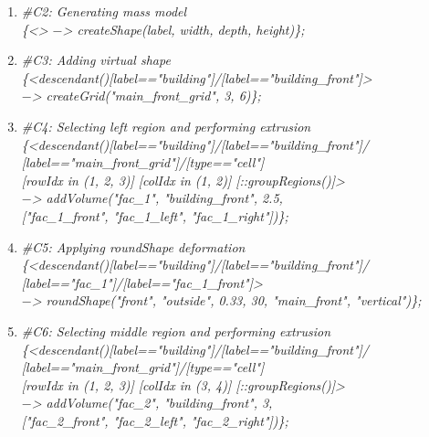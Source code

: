 \begin{enumerate}[label=(\alph*)]
    \item \textit{\#C2: Generating mass model} \\
            \textit{\{<> $-$> createShape(label, width, depth, height)\};}
            
    \item \textit{\#C3: Adding virtual shape} \\
            \qquad \textit{\{<descendant()[label=="building"]/[label=="building\_front"]>} \\
            \qquad \textit{$-$> createGrid("main\_front\_grid", 3, 6)\};}
    
    \item \textit{\#C4: Selecting left region and performing extrusion} \\
            \qquad \textit{\{<descendant()[label=="building"]/[label=="building\_front"]/} \\
            \qquad \textit{[label=="main\_front\_grid"]/[type=="cell"]} \\
            \qquad \textit{[rowIdx in (1, 2, 3)] [colIdx in (1, 2)] [::groupRegions()]>} \\
            \qquad \textit{$-$> addVolume("fac\_1", "building\_front", 2.5,} \\
            \qquad \textit{["fac\_1\_front", "fac\_1\_left", "fac\_1\_right"])\};}
            
    \item \textit{\#C5: Applying roundShape deformation} \\
            \qquad \textit{\{<descendant()[label=="building"]/[label=="building\_front"]/} \\
            \qquad \textit{[label=="fac\_1"]/[label=="fac\_1\_front"]>} \\
            \qquad \textit{$-$> roundShape("front", "outside", 0.33, 30, "main\_front", "vertical")\};}
            
    \item \textit{\#C6: Selecting middle region and performing extrusion} \\
            \qquad \textit{\{<descendant()[label=="building"]/[label=="building\_front"]/} \\
            \qquad \textit{[label=="main\_front\_grid"]/[type=="cell"]} \\
            \qquad \textit{[rowIdx in (1, 2, 3)] [colIdx in (3, 4)] [::groupRegions()]>} \\
            \qquad \textit{$-$> addVolume("fac\_2", "building\_front", 3,} \\
            \qquad \textit{["fac\_2\_front", "fac\_2\_left", "fac\_2\_right"])\};}
            

\end{enumerate}
